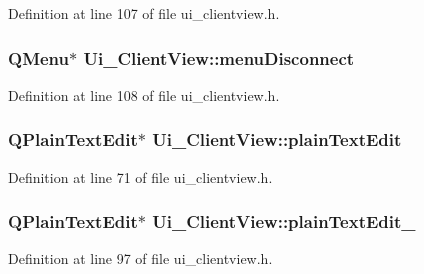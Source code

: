 Definition at line 107 of file ui\+\_\+clientview.\+h.

\hypertarget{class_ui___client_view_afd776f219279b093a26a205207bb3530}{}
\subsubsection[{menu\+Disconnect}]{\setlength{\rightskip}{0pt plus 5cm}Q\+Menu$\ast$ Ui\+\_\+\+Client\+View\+::menu\+Disconnect}\label{class_ui___client_view_afd776f219279b093a26a205207bb3530}


Definition at line 108 of file ui\+\_\+clientview.\+h.

\hypertarget{class_ui___client_view_a4cb26f24cf265d02d4d60bd7f7c62547}{}
\subsubsection[{plain\+Text\+Edit}]{\setlength{\rightskip}{0pt plus 5cm}Q\+Plain\+Text\+Edit$\ast$ Ui\+\_\+\+Client\+View\+::plain\+Text\+Edit}\label{class_ui___client_view_a4cb26f24cf265d02d4d60bd7f7c62547}


Definition at line 71 of file ui\+\_\+clientview.\+h.

\hypertarget{class_ui___client_view_a556640ed20d1f296411371f62ab33781}{}
\subsubsection[{plain\+Text\+Edit\+\_\+2}]{\setlength{\rightskip}{0pt plus 5cm}Q\+Plain\+Text\+Edit$\ast$ Ui\+\_\+\+Client\+View\+::plain\+Text\+Edit\+\_}\label{class_ui___client_view_a556640ed20d1f296411371f62ab33781}


Definition at line 97 of file ui\+\_\+clientview.\+h.

\hypertarget{class_ui___client_view_ab0bc490a387f6e96e63bc12e2994fd13}{}
